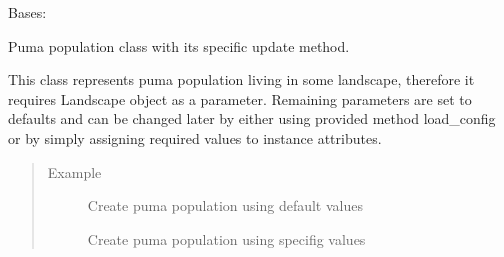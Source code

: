 \documentclass[letterpaper,10pt,english]{sphinxmanual}
\begin{document}
\begin{fulllineitems}
\label{\detokenize{pumha:pumha.pop.PumaPopulation}}
Bases: {\hyperref[\detokenize{pumha:pumha.pop.Population}]{}}

Puma population class with its specific update method.

This class represents puma population living in some landscape,
therefore it requires Landscape object as a parameter.
Remaining parameters are set to defaults and can be changed later
by either using provided method load\_config or by simply assigning
required values to instance attributes.
\begin{quote}\begin{description}
\item[{Example}] \leavevmode
Create puma population using default values

\begin{sphinxVerbatim}[commandchars=\\\{\}]
   
   
  
  
\end{sphinxVerbatim}

Create puma population using specifig values

\begin{sphinxVerbatim}[commandchars=\\\{\}]
   
   
  
    
\end{sphinxVerbatim}


\end{description}
\end{quote}
\end{fulllineitems}
\end{document}
